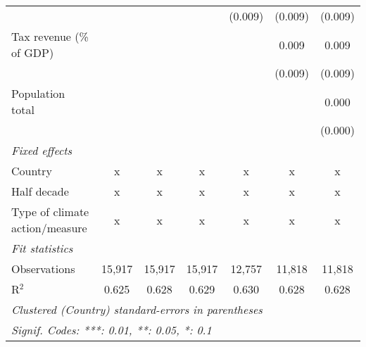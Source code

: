 \begin{tabular}{lcccccc}
                                                             &         &               &               & (0.009)        & (0.009)        & (0.009)\\   
   Tax revenue (\% of GDP)                                   &         &               &               &                & 0.009          & 0.009\\   
                                                             &         &               &               &                & (0.009)        & (0.009)\\   
   Population total                                          &         &               &               &                &                & 0.000\\   
                                                             &         &               &               &                &                & (0.000)\\   
   \emph{Fixed effects}\\
   Country                                                   & x       & x             & x             & x              & x              & x\\  
   Half decade                                               & x       & x             & x             & x              & x              & x\\  
   Type of climate action/measure                            & x       & x             & x             & x              & x              & x\\  
   \midrule \emph{Fit statistics}\\
   Observations                                              & 15,917  & 15,917        & 15,917        & 12,757         & 11,818         & 11,818\\  
   R$^2$                                                     & 0.625   & 0.628         & 0.629         & 0.630          & 0.628          & 0.628\\  
   \midrule
   \multicolumn{7}{l}{\emph{Clustered (Country) standard-errors in parentheses}}\\
   \multicolumn{7}{l}{\emph{Signif. Codes: ***: 0.01, **: 0.05, *: 0.1}}\\
\end{tabular}
\par\endgroup


